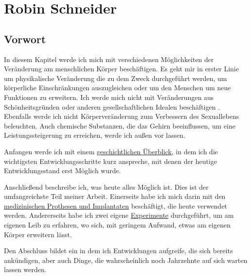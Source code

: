\chapter{Robin Schneider}
\label{sec:Robin_Schneider}


\section{Vorwort}
In diesem Kapitel werde ich mich mit verschiedenen Möglichkeiten der Veränderung am menschlichen Körper beschäftigen.
Es geht mir in erster Linie um physikalische Veränderung die zu dem Zweck durchgeführt werden,
um körperliche Einschränkungen auszugleichen oder um den Menschen um neue Funktionen zu erweitern.
Ich werde mich nicht mit Veränderungen aus Schönheitsgründen
oder anderen gesellschaftlichen Idealen beschäftigen .
Ebenfalls werde ich nicht Körperveränderung zum Verbessern des Sexuallebens beleuchten.
Auch chemische Substanzen, die das Gehirn beeinflussen,
um eine Leistungssteigerung zu erreichen, werde ich außen vor lassen.


\bigskip
Anfangen werde ich mit einem \hyperref[sec:Robin:historical_overview]{geschichtlichen Überblick},
in dem ich die wichtigsten Entwicklungsschritte kurz anspreche, mit denen der heutige
Entwicklungsstand erst Möglich wurde.

Anschließend beschreibe ich, was heute alles Möglich ist.
Dies ist der umfangreichste Teil meiner Arbeit. Einerseits habe ich mich darin mit den
\hyperref[sec:Robin:topical]{medizinischen Prothesen und Implantaten} beschäftigt, die heute
verwendet werden.
Andererseits habe ich zwei eigene \hyperref[sec:Robin:experiments]{Experimente} durchgeführt, um am
eigenen Leib zu erfahren, wo sich, mit geringem Aufwand, etwas am eigenen Körper erweitern lässt.

Den Abschluss bildet ein  in dem ich Entwicklungen aufgreife, die sich
bereits ankündigen, aber auch Dinge, die wahrscheinlich noch Jahrzehnte auf sich warten lassen
werden.









\nocite{thesis:Cyborg, Stern:pacemaker}



\printbibliography[heading=source,keyword=Robin]
